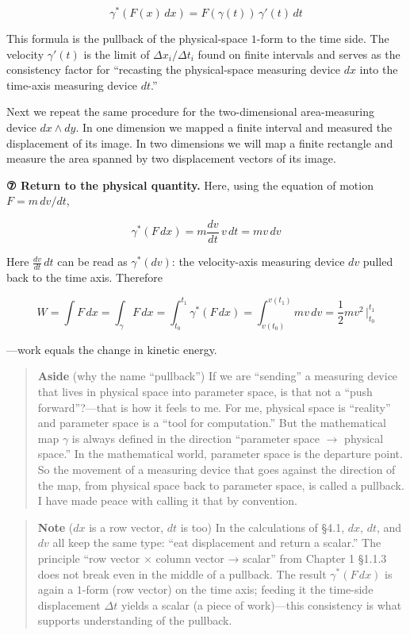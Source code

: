 \[
\gamma^*(F(x)\,dx)
=
F(\gamma(t))\,\gamma'(t)\,dt
\]

This formula is the pullback of the physical-space \(1\)-form to the
time side. The velocity \(\gamma'(t)\) is the limit of
\(\Delta x_i/\Delta t_i\) found on finite intervals and serves as the
consistency factor for ``recasting the physical-space measuring device
\(dx\) into the time-axis measuring device \(dt\).''

Next we repeat the same procedure for the two-dimensional area-measuring
device \(dx\wedge dy\). In one dimension we mapped a finite interval and
measured the displacement of its image. In two dimensions we will map a
finite rectangle and measure the area spanned by two displacement
vectors of its image.

\textbf{⑦ Return to the physical quantity.} Here, using the equation of
motion \(F = m\,dv/dt\),

\[\gamma^*(F\,dx) = m\frac{dv}{dt}\,v\,dt = m v\,dv\]

Here \(\frac{dv}{dt}\,dt\) can be read as \(\gamma^*(dv)\): the
velocity-axis measuring device \(dv\) pulled back to the time axis.
Therefore

\[W = \int F\,dx = \int_{\gamma} F\,dx = \int_{t_0}^{t_1} \gamma^*(F\,dx) = \int_{v(t_0)}^{v(t_1)} m v\,dv = \frac{1}{2}mv^2\,\Big|_{t_0}^{t_1}\]

---work equals the change in kinetic energy.

\begin{quote}
\textbf{Aside} (why the name ``pullback'') If we are ``sending'' a
measuring device that lives in physical space into parameter space, is
that not a ``push forward''?---that is how it feels to me. For me,
physical space is ``reality'' and parameter space is a ``tool for
computation.'' But the mathematical map \(\gamma\) is always defined in
the direction ``parameter space \(\to\) physical space.'' In the
mathematical world, parameter space is the departure point. So the
movement of a measuring device that goes against the direction of the
map, from physical space back to parameter space, is called a pullback.
I have made peace with calling it that by convention.
\end{quote}

\begin{quote}
\textbf{Note} (\(dx\) is a row vector, \(dt\) is too) In the
calculations of §4.1, \(dx\), \(dt\), and \(dv\) all keep the same type:
``eat displacement and return a scalar.'' The principle ``row vector ×
column vector → scalar'' from Chapter 1 §1.1.3 does not break even in
the middle of a pullback. The result \(\gamma^*(F\,dx)\) is again a
\(1\)-form (row vector) on the time axis; feeding it the time-side
displacement \(\Delta t\) yields a scalar (a piece of work)---this
consistency is what supports understanding of the pullback.
\end{quote}

